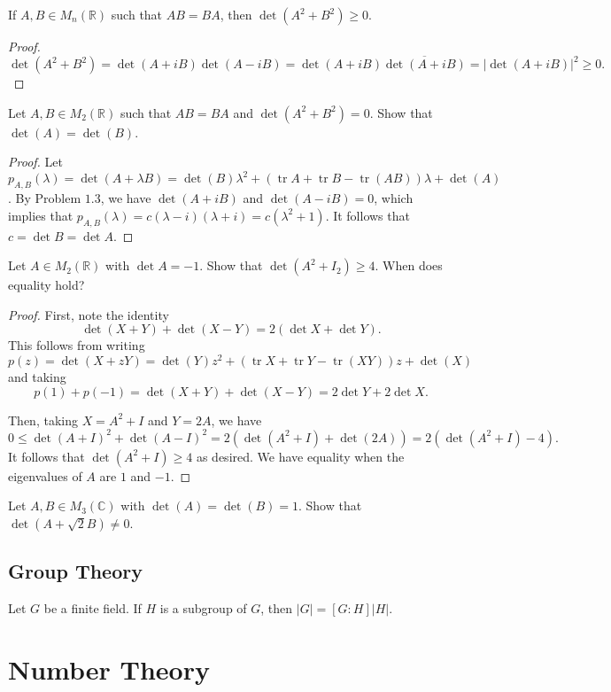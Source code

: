 \documentclass[11pt]{article}
\newcommand{\R}{\mathbb{R}}
\newcommand{\C}{\mathbb C}
\renewcommand{\>}{\rangle}
\newcommand{\<}{\langle}
\newcommand{\tr}{\operatorname{tr}}
\let \ol \overline
\begin{document}
\begin{problem} If $A, B \in M_n(\R)$ such that $AB = BA$, then $\det(A^2 + B^2) \ge 0$.
\end{problem}
\begin{proof}
$$\det(A^2 + B^2) = \det(A+iB)\det(A - iB) = \det(A + iB) \ol{\det(A + iB)} = |\det(A + iB)|^2\ge 0.$$
\end{proof}
\begin{problem} Let $A, B \in M_2(\R)$ such that $AB = BA$ and $\det(A^2 + B^2) = 0$.  Show that $\det(A) = \det(B)$.
\end{problem}
\begin{proof}
Let $p_{A, B}(\lambda) = \det(A + \lambda B) = \det(B) \lambda^2 + (\tr A + \tr B - \tr(AB)) \lambda + \det(A)$.  By Problem $1.3$, we have $\det(A + iB)$ and $\det(A-iB) = 0$, which implies that $p_{A, B}(\lambda) = c(\lambda - i)(\lambda + i) = c(\lambda^2 + 1)$.  It follows that $c = \det B = \det A$.
\end{proof}

\begin{problem} Let $A \in M_2(\R)$ with $\det A = -1$.  Show that $\det(A^2 + I_2) \ge 4$.  When does equality hold?
\end{problem}
\begin{proof}
First, note the identity 
$$\det(X+Y) + \det(X - Y) = 2(\det X+ \det Y).$$
This follows from writing $p(z) = \det(X + zY) = \det(Y) z^2 + (\tr X + \tr Y - \tr(XY)) z + \det(X)$ and taking 
$$p(1) + p(-1) = \det(X+Y) + \det(X - Y) = 2\det Y + 2 \det X.$$

Then, taking $X = A^2 + I$ and $Y = 2A$, we have 
$$0 \le  \det(A + I)^2 + \det(A - I)^2 = 2(\det(A^2 + I) + \det(2A)) = 2(\det(A^2 + I) - 4).$$
It follows that $\det(A^2 + I) \ge 4$ as desired.  We have equality when the eigenvalues of $A$ are $1$ and $-1$.  
\end{proof}

\begin{problem} Let $A, B \in M_3(\C)$ with $\det(A) = \det(B) = 1$.  Show that $\det(A + \sqrt{2} B) \ne 0$.
\end{problem}
\subsection{Group Theory}
\begin{theorem} Let $G$ be a finite field.  If $H$ is a subgroup of $G$, then $|G| = [G:H]|H|$.
\end{theorem}
\pagebreak
\section{Number Theory}
\end{document}
